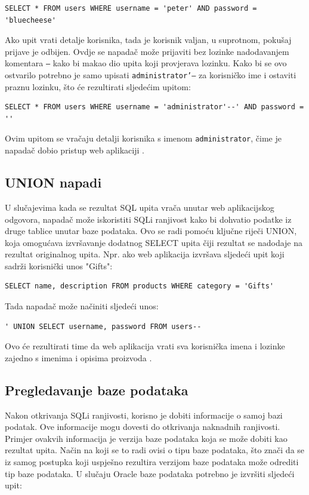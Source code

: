 \documentclass[12pt, oneside, onecolumn]{book}
\begin{document}
{\begin{verbatim}
SELECT * FROM users WHERE username = 'peter' AND password = 'bluecheese'
\end{verbatim}

Ako upit vrati detalje korisnika, tada je korisnik valjan, u suprotnom, pokušaj prijave je odbijen. Ovdje se napadač može prijaviti bez lozinke nadodavanjem komentara \texttt{--} kako bi makao dio upita koji provjerava lozinku. Kako bi se ovo ostvarilo potrebno je samo upisati \texttt{administrator'--} za korisničko ime i ostaviti praznu lozinku, što će rezultirati sljedećim upitom:

\begin{verbatim}
SELECT * FROM users WHERE username = 'administrator'--' AND password = ''
\end{verbatim}

Ovim upitom se vračaju detalji korisnika s imenom \texttt{administrator}, čime je napadač dobio pristup web aplikaciji \cite{sitesqli}.

\subsection{UNION napadi}
U slučajevima kada se rezultat SQL upita vrača unutar web aplikacijskog odgovora, napadač može iskoristiti SQLi ranjivost kako bi dohvatio podatke iz druge tablice unutar baze podataka. Ovo se radi pomoću ključne riječi UNION, koja omogućava izvršavanje dodatnog SELECT upita čiji rezultat se nadodaje na rezultat originalnog upita. Npr. ako web aplikacija izvršava sljedeći upit koji sadrži korisnički unos "Gifts":

\begin{verbatim}
SELECT name, description FROM products WHERE category = 'Gifts'
\end{verbatim}

Tada napadač može načiniti sljedeći unos:

\begin{verbatim}
' UNION SELECT username, password FROM users--
\end{verbatim}

Ovo će rezultirati time da web aplikacija vrati sva korisnička imena i lozinke zajedno s imenima i opisima proizvoda \cite{sitesqli}.

\subsection{Pregledavanje baze podataka}
Nakon otkrivanja SQLi ranjivosti, korisno je dobiti informacije o samoj bazi podatak. Ove informacije mogu dovesti do otkrivanja naknadnih ranjivosti. Primjer ovakvih informacija je verzija baze podataka koja se može dobiti kao rezultat upita. Način na koji se to radi ovisi o tipu baze podataka, što znači da se iz samog postupka koji uspješno rezultira verzijom baze podataka može odrediti tip baze podataka. U slučaju Oracle baze podataka potrebno je izvršiti sljedeći upit:

}
\end{document}

